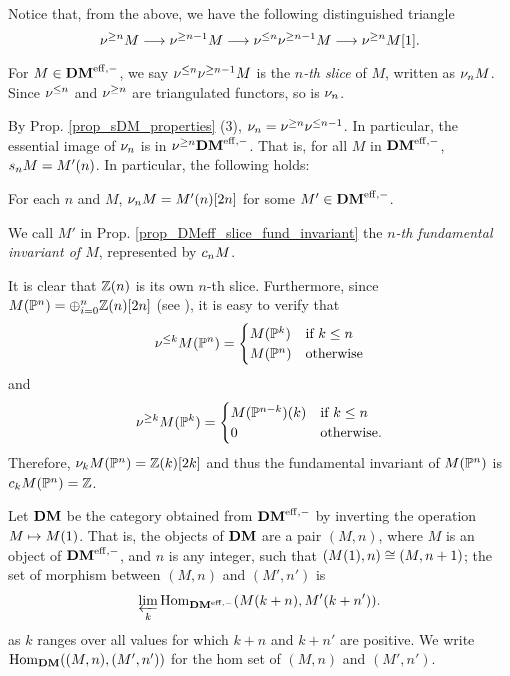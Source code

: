 Notice that, from the above, we have the following distinguished
triangle
\begin{equation}
\sgDM{n} M \to \sgDM{n - 1} M \to \slDM{n} \sgDM{n - 1} M
\to \sgDM{n} M[1].
\end{equation}

\begin{defn}
For $M \in \DMeff$, we say $\slDM{n}\sgDM{n - 1}M$ is the 
\emph{$n$-th slice} of $M$, written as $\sliceDM{n}M$. Since
$\slDM{n}$ and $\sgDM{n}$ are triangulated functors, so is 
$\sliceDM{n}$.
\end{defn}

By Prop. \ref{prop_sDM_properties} (3), $\sliceDM{n} =
\sgDM{n}\slDM{n - 1}$. In particular, the essential image of
$\sliceDM{n}$ is in $\sgDM{n}\DMeff$. That is, for all $M$ in 
$\DMeff$, $\slice{n}M = \tZ[n]{M'}$. In particular, the following
holds:

\begin{prop}\label{prop_DMeff_slice_fund_invariant}
For each $n$ and $M$, $\sliceDM{n}M = M'(n)[2n]$ for some $M' \in
\DMeff$.
\end{prop}

\begin{defn}\label{def_fI_DMeff}
We call $M'$ in Prop. \ref{prop_DMeff_slice_fund_invariant} the 
\emph{$n$-th fundamental invariant of $M$}, represented by
$\fIDM{n}M$.
\end{defn}

\begin{ex}\label{ex_sfilt_MPn}
It is clear that $\Z(n)$ is its own $n$-th slice. Furthermore,
since $M(\P^n) = \oplus_{i = 0}^n \Z(n)[2n]$ (see 
\cite[Corollary 15.5]{MVW}), it is easy to verify that 
\[
\slDM{k}M(\P^n) = \begin{cases}
M(\P^k) & \textrm{if }k \leq n \\
M(\P^n) & \textrm{otherwise}
\end{cases}
\]
and 
\[
\sgDM{k}M(\P^k) = \begin{cases}
\tZ[k]{M(\P^{n - k})} & \textrm{if }k \leq n\\
0 & \textrm{otherwise}.
\end{cases}
\]
Therefore, $\sliceDM{k} M(\P^n) = \Z(k)[2k]$ and thus the 
fundamental invariant of $M(\P^n)$ is $\fIDM{k}M(\P^n) = \Z$.
\end{ex}

\begin{defn}
Let $\DM$ be the category obtained from $\DMeff$ by inverting
the operation $M \mapsto \tZ{M}$. That is, the objects of $\DM$
are a pair $(M, n)$, where $M$ is an object of $\DMeff$, and $n$
is any integer, such that $(\tZ{M}, n) \cong (M, n + 1)$; the set 
of morphism between $(M, n)$ and $(M', n')$ is 
\[
\varprojlim_{k} \homDMf(\tZ[k + n]{M}, \tZ[k + n']{M'}).
\]
as $k$ ranges over all values for which $k + n$ and $k + n'$ are
positive. We write $\homDM((M, n), (M',n'))$ for the hom set of 
$(M, n)$ and $(M', n')$. 
\end{defn}

